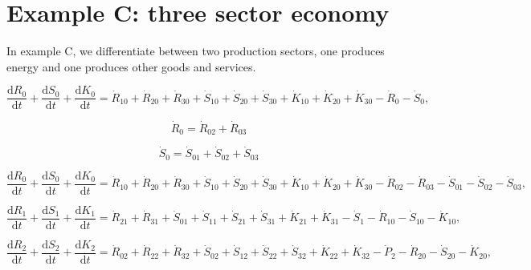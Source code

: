 \section{Example C: three sector economy}
\label{sec:C_materials}

In example C, we differentiate between two production sectors, one produces energy and one produces other goods and services.


\begin{equation} \label{eq:C-CV_R_dot_0a}
	\frac{\mathrm{d}R_{0}}{\mathrm{d}t} 
	+ \frac{\mathrm{d}S_{0}}{\mathrm{d}t}	
	+ \frac{\mathrm{d}K_0}{\mathrm{d}t}
	=  \dot{R}_{10} + \dot{R}_{20} + \dot{R}_{30}
	+ \dot{S}_{10} + \dot{S}_{20} + \dot{S}_{30}
	+ \dot{K}_{10} + \dot{K}_{20} + \dot{K}_{30}
	- \dot{R}_{0} 
	- \dot{S}_{0},
\end{equation}

\begin{equation}
	\dot{R}_{0} = \dot{R}_{02} + \dot{R}_{03}
\end{equation}

\begin{equation}
	\dot{S}_{0} = \dot{S}_{01} + \dot{S}_{02} + \dot{S}_{03}
\end{equation}

 \begin{equation} \label{eq:C-CV_R_dot_0b}
 	\frac{\mathrm{d}R_{0}}{\mathrm{d}t} 
 	+ \frac{\mathrm{d}S_{0}}{\mathrm{d}t}	
 	+ \frac{\mathrm{d}K_0}{\mathrm{d}t}
 	=  \dot{R}_{10} + \dot{R}_{20} + \dot{R}_{30}
 	+ \dot{S}_{10} + \dot{S}_{20} + \dot{S}_{30}
 	+ \dot{K}_{10} + \dot{K}_{20} + \dot{K}_{30}
 	- \dot{R}_{02} - \dot{R}_{03} 
 	- \dot{S}_{01} - \dot{S}_{02} - \dot{S}_{03},
 \end{equation}
 
 \begin{equation} \label{eq:C-CV_R_dot_1}
 	\frac{\mathrm{d}R_{1}}{\mathrm{d}t} 
	+ \frac{\mathrm{d}S_{1}}{\mathrm{d}t}
 	+ \frac{\mathrm{d}K_{1}}{\mathrm{d}t}
 	=  \dot{R}_{21} + \dot{R}_{31}
 	+ \dot{S}_{01} + \dot{S}_{11} 
	+ \dot{S}_{21} + \dot{S}_{31}
 	+ \dot{K}_{21} + \dot{K}_{31}
 	- \dot{S}_{1} 
	- \dot{R}_{10} 
 	- \dot{S}_{10} 
 	- \dot{K}_{10},
 \end{equation}
 
 \begin{equation} \label{eq:C-CV_R_dot_2}
 	\frac{\mathrm{d}R_{2}}{\mathrm{d}t} 
	+ \frac{\mathrm{d}S_{2}}{\mathrm{d}t}
 	+ \frac{\mathrm{d}K_{2}}{\mathrm{d}t}
 	=  \dot{R}_{02} + \dot{R}_{22} + \dot{R}_{32}
 	+ \dot{S}_{02} + \dot{S}_{12} 
	+ \dot{S}_{22} + \dot{S}_{32} 
 	+ \dot{K}_{22} + \dot{K}_{32}
 	- \dot{P}_{2}
 	- \dot{R}_{20} 
 	- \dot{S}_{20} 
 	- \dot{K}_{20},
 \end{equation}
 
